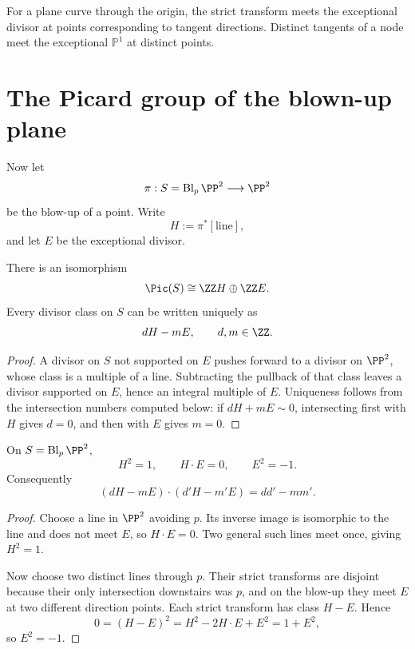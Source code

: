 \begin{example}\label{ex:vi45-expand-02}
For a plane curve through the origin, the strict transform meets the exceptional divisor at points corresponding to tangent directions.  Distinct tangents of a node meet the exceptional $\mathbb P^1$ at distinct points.
\end{example}
\section{The Picard group of the blown-up plane}

Now let
\[
  \pi:S=\Bl_p\PP^2\longrightarrow\PP^2
\]
be the blow-up of a point.  Write
\[
  H:=\pi^*[\text{line}],
\]
and let \(E\) be the exceptional divisor.

\begin{theorem}\label{thm:vi45-picard-one-point}
There is an isomorphism
\[
  \Pic(S)\cong\ZZ H\oplus\ZZ E.
\]
Every divisor class on \(S\) can be written uniquely as
\[
  dH-mE,
\qquad d,m\in\ZZ.
\]
\end{theorem}

\begin{proof}
A divisor on \(S\) not supported on \(E\) pushes forward to a divisor on \(\PP^2\), whose class is a multiple of a line.  Subtracting the pullback of that class leaves a divisor supported on \(E\), hence an integral multiple of \(E\).  Uniqueness follows from the intersection numbers computed below: if \(dH+mE\sim0\), intersecting first with \(H\) gives \(d=0\), and then with \(E\) gives \(m=0\).
\end{proof}

\begin{theorem}\label{thm:vi45-intersection-form}
On \(S=\Bl_p\PP^2\),
\[
  \boxed{H^2=1,\qquad H\cdot E=0,\qquad E^2=-1.}
\]
Consequently
\[
  (dH-mE)\cdot(d'H-m'E)=dd'-mm'.
\]
\end{theorem}

\begin{proof}
Choose a line in \(\PP^2\) avoiding \(p\).  Its inverse image is isomorphic to the line and does not meet \(E\), so \(H\cdot E=0\).  Two general such lines meet once, giving \(H^2=1\).

Now choose two distinct lines through \(p\).  Their strict transforms are disjoint because their only intersection downstairs was \(p\), and on the blow-up they meet \(E\) at two different direction points.  Each strict transform has class \(H-E\).  Hence
\[
  0=(H-E)^2=H^2-2H\cdot E+E^2=1+E^2,
\]
so \(E^2=-1\).
\end{proof}

